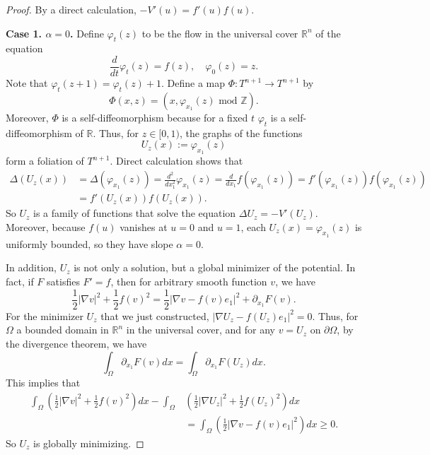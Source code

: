 \documentclass[10pt,a4paper]{amsart}
\def\R{\mathbb R}
\def\Z{\mathbb Z}
\begin{document}
		\begin{proof}
			By a direct calculation, $-V'(u)=f'(u)f(u)$.
			
			{\bf Case 1. $\alpha=0$.} Define $\varphi_t(z)$ to be the flow in the universal cover $\R^n$ of the equation 
			\[
			\frac{d}{dt}\varphi_t(z)=f(z),\quad \varphi_0(z)=z.
			\]
			Note that $\varphi_{t}(z+1)=\varphi_t(z)+1$.
			Define a map $\Phi:T^{n+1}\to T^{n+1}$ by 
			\begin{equation}
				\Phi(x,z)=(x,\varphi_{x_1}(z) \text{ mod $\Z$}).   
			\end{equation}
			Moreover, $\Phi$ is a self-diffeomorphism because for a fixed $t$ $\varphi_t$ is a self-diffeomorphism of $\R$. Thus, for $z\in[0,1)$, the graphs of the functions
			\begin{equation}
				U_z(x):=\varphi_{x_1}(z)
			\end{equation}
			form a foliation of $T^{n+1}$. Direct calculation shows that
			\begin{equation}
				\begin{split}
					\Delta (U_z(x))
					&=\Delta(\varphi_{x_1}(z))
					=
					\frac{d^2}{dx_1^2}\varphi_{x_1}(z)
					=\frac{d}{dx_1}f(\varphi_{x_1}(z))
					=
					f'(\varphi_{x_1}(z))f(\varphi_{x_1}(z))
					\\
					&= f'(U_z(x))f(U_z(x)).
				\end{split}
			\end{equation}
			So $U_z$ is a family of functions that solve the equation $\Delta U_z =- V' (U_z)$. Moreover, because $f(u)$ vanishes at $u=0$ and $u=1$, each $U_z(x)=\varphi_{x_1}(z)$ is uniformly bounded, so they have slope $\alpha=0$.
			
			In addition, $U_z$ is not only a solution, but a global minimizer of the potential. In fact, if $F$ satisfies $F'=f$, then for arbitrary smooth function $v$, we have
			\begin{equation}
				\frac{1}{2}|\nabla v|^2+\frac{1}{2}f(v)^2=\frac{1}{2}|\nabla v-f(v)e_1|^2+\partial_{x_1}F(v).
			\end{equation}
			For the minimizer $U_z$ that we just constructed, $|\nabla U_z-f(U_z)e_1|^2=0$. Thus, for $\Omega$ a bounded domain in $\R^n$ in the universal cover, and for any $v=U_z$ on $\partial\Omega$, by the divergence theorem, we have
			\[
			\int_\Omega \partial_{x_1}F(v)dx=\int_\Omega \partial_{x_1}F(U_z)dx.
			\]
			This implies that
			\begin{equation}
				\begin{split}
					\int_{\Omega} \left(
					\frac{1}{2}|\nabla v|^2+\frac{1}{2}f(v)^2
					\right)dx
					-
					\int_{\Omega}& \left(
					\frac{1}{2}|\nabla U_z|^2+\frac{1}{2}f(U_z)^2
					\right)dx
					\\&=
					\int_{\Omega} \left(
					\frac{1}{2}|\nabla v-f(v)e_1|^2    \right)dx\geq 0.
				\end{split}
			\end{equation}
			So $U_z$ is globally minimizing.
			

\end{proof}
\end{document}
